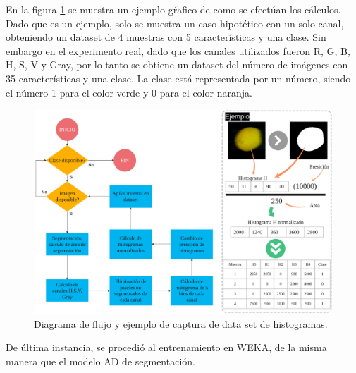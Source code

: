 \documentclass[twoside,spanish,ESP,MSc]{plantillaLabUPV}
\theoremstyle{definition}
\begin{document}
En la figura \ref{fig:dscolor} se muestra un ejemplo gŕafico de como se efectúan los cálculos. Dado que es un ejemplo, solo se muestra un caso hipotético con un solo canal, obteniendo un dataset de 4 muestras con 5 características y una clase. Sin embargo en el experimento real, dado que los canales utilizados fueron R, G, B, H, S, V y Gray, por lo tanto se obtiene un dataset del número de imágenes con 35 características y una clase. La clase está representada por un número, siendo el número 1 para el color verde y 0 para el color naranja.

\begin{figure}
	\centering
	\includegraphics[width=0.9\linewidth]{edrawimas/dscolor}
	\caption{Diagrama de flujo y ejemplo de captura de data set de histogramas.}
	\label{fig:dscolor}
\end{figure}


De última instancia, se procedió al entrenamiento en WEKA, de la misma manera que el modelo AD de segmentación.



\end{document}
